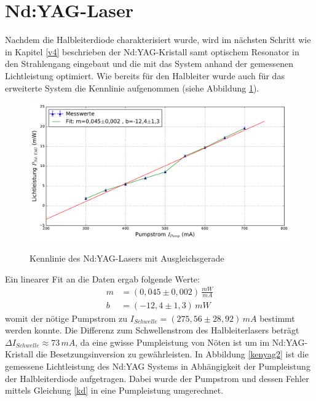 \documentclass[twoside,colorback,accentcolor=tud4c,11pt]{tudreport}
\begin{document}
\section{Nd:YAG-Laser}
Nachdem die Halbleiterdiode charakterisiert wurde, wird im nächsten Schritt wie in Kapitel \ref{v4} beschrieben der Nd:YAG-Kristall samt optischem Resonator in den Strahlengang eingebaut und die mit das System anhand der gemessenen Lichtleistung optimiert. Wie bereits für den Halbleiter wurde auch für das erweiterte System die Kennlinie aufgenommen (siehe Abbildung \ref{kenyag}).

\begin{figure}[H]
\centering
   	\begin{minipage}[b]{0.85\textwidth}
   	\includegraphics[width=\textwidth]{graphics/kenn_ndyag_PS.pdf}
  	\label{kenyag}
   	\end{minipage}
\caption{Kennlinie des Nd:YAG-Lasers mit Ausgleichsgerade}	
\end{figure}
Ein linearer Fit an die Daten ergab folgende Werte:
\begin{align}
m&= (0,045\pm 0,002)\,\si{\frac{mW}{mA}}\\
b&= (-12,4\pm 1,3)\,\si{mW}
\end{align}
womit der nötige Pumpstrom zu $I_{Schwelle}=(275,56\pm 28,92)\,\si{mA}$ bestimmt werden konnte. Die Differenz zum Schwellenstrom des Halbleiterlasers beträgt $\Delta I_{Schwelle}\approx 73\,\si{mA}$, da eine gwisse Pumpleistung von Nöten ist um im Nd:YAG-Kristall die Besetzungsinversion zu gewährleisten. In Abbildung \ref{kenyag2} ist die gemessene Lichtleistung des Nd:YAG Systems in Abhängigkeit der Pumpleistung der Halbleiterdiode aufgetragen. Dabei wurde der Pumpstrom und dessen Fehler mittels Gleichung \ref{kd} in eine Pumpleistung umgerechnet.
\end{document}
